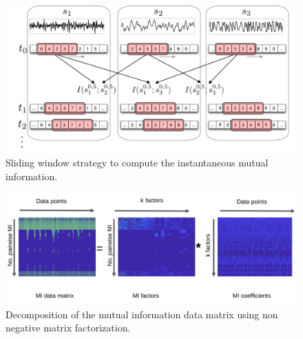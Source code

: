 \TODO


\begin{figure}[!th]
	\begin{center}
		\hspace*{\fill}
		\includegraphics[width=0.99\columnwidth]{mi_sliding_window.png}
		\hspace*{\fill}
	\end{center}
	\caption{\label{fig:mi_sliding_window} Sliding window strategy to compute the instantaneous mutual information.}
\end{figure}

\begin{figure}[!th]
	\centering
	\includegraphics[width=0.9\columnwidth]{fig/nnmf.png}
	\caption{Decomposition of the mutual information data matrix using non negative matrix factorization.}
	\label{fig:nnmf}
\end{figure}


